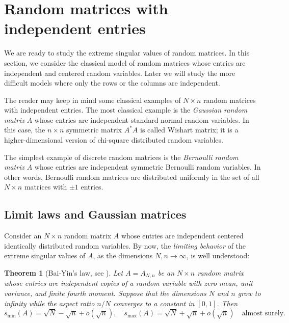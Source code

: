 \documentclass[10pt, openany]{book}
\newtheorem{theorem}{Theorem}[chapter]
\theoremstyle{remark}
\def \smin {s_{\min}}
\def \smax {s_{\max}}
\begin{document}
\section{Random matrices with independent entries}				\label{s: entries}

We are ready to study the extreme singular values of random matrices. 
In this section, we consider the classical model of random matrices whose entries are independent and centered
random variables. Later we will study the more difficult models where 
only the rows or the columns are independent. 

The reader may keep in mind some classical examples of $N \times n$ random matrices with independent entries.
The most classical example is the {\em Gaussian random matrix} $A$ 
whose entries are independent standard normal random variables. In this case, 
the $n \times n$ symmetric matrix $A^*A$ is called Wishart matrix; it is a higher-dimensional version of 
chi-square distributed random variables.

The simplest example of discrete random matrices is the {\em Bernoulli random matrix} $A$ 
 whose entries 
are independent symmetric Bernoulli random variables. In other words, Bernoulli random matrices are distributed
uniformly in the set of all $N \times n$ matrices with $\pm 1$ entries.




\subsection{Limit laws and Gaussian matrices}

Consider an $N \times n$ random matrix $A$ whose entries are independent centered identically distributed
random variables.  By now, the {\em limiting behavior} of the extreme singular values of $A$, 
as the dimensions $N, n \to \infty$, is well understood:

\begin{theorem}[Bai-Yin's law, see \cite{Bai-Yin}]         \label{Bai-Yin}
  Let $A = A_{N,n}$ be an $N \times n$ random matrix whose entries
  are independent copies of a random variable with zero mean, unit variance,
  and finite fourth moment. Suppose that the dimensions $N$ and $n$ grow to infinity
  while the aspect ratio $n/N$ converges to a constant in $[0,1]$.
  Then
  $$
  \smin(A) = \sqrt{N} - \sqrt{n} + o(\sqrt{n}), \quad
  \smax(A) = \sqrt{N} + \sqrt{n} + o(\sqrt{n}) \quad
  \text{almost surely}.
  $$
\end{theorem}
\end{document}
